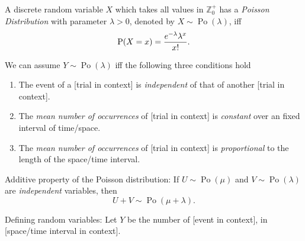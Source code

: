 \documentclass[oneside]{book}
\begin{document}
\begin{definition}{}{}
  A discrete random variable \(X\) which takes all values in \(\mathbb{Z}_{0}^{+}\) has a \emph{Poisson Distribution} with parameter \(\lambda>0\), denoted by \(X \sim \operatorname{Po}(\lambda)\), iff 
  \[\operatorname{P}(X=x)=\frac{e^{-\lambda}\lambda^x}{x!}.\]
\end{definition}
\begin{note}
  We can assume \(Y \sim \operatorname{Po}(\lambda)\) iff the following three conditions hold
  \begin{enumerate}
    \item The event of a [trial in context] is \emph{independent} of that of another [trial in context].
    \item The \emph{mean number of occurrences} of [trial in context] is \emph{constant} over an fixed interval of time/space.
    \item The \emph{mean number of occurrences} of [trial in context] is \emph{proportional} to the length of the space/time interval.
  \end{enumerate}
\end{note}
\begin{note}
  Additive property of the Poisson distribution: If \(U \sim \operatorname{Po}(\mu)\) and \(V \sim \operatorname{Po}(\lambda)\) are \emph{independent} variables, then 
  \[U+V \sim \operatorname{Po}(\mu+\lambda).\]
\end{note}
\begin{note}
  Defining random variables: Let \(Y\) be the number of [event in context], in [space/time interval in context].  
\end{note}
\end{document}
